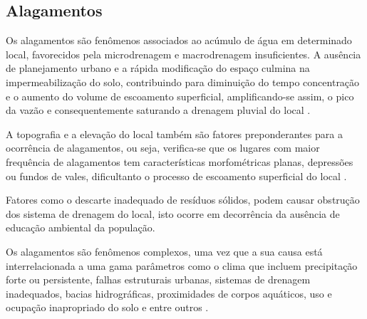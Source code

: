 \subsection{Alagamentos}
Os alagamentos são fenômenos associados ao acúmulo de água em determinado local, favorecidos pela microdrenagem e macrodrenagem insuficientes. A ausência de planejamento urbano e a rápida modificação do espaço culmina na impermeabilização do solo, contribuindo para diminuição do tempo concentração e o aumento do volume de escoamento superficial, amplificando-se assim, o pico da vazão e consequentemente saturando a drenagem pluvial do local \cite{hansmann2013descriccao}. 
\par A topografia e a elevação do local também são fatores preponderantes para a ocorrência de alagamentos, ou seja, verifica-se que os lugares com maior frequência de alagamentos tem características morfométricas planas, depressões ou fundos de vales, dificultanto o processo de escoamento superficial do local \cite{braga2016alagamentos}.
\par Fatores como o descarte inadequado de resíduos sólidos, podem causar obstrução dos sistema de drenagem do local, isto ocorre em decorrência da ausência de educação ambiental da população. 
\par Os alagamentos são fenômenos complexos, uma vez que a sua causa está  interrelacionada a uma gama parâmetros como o clima que incluem precipitação forte ou persistente, falhas estruturais urbanas, sistemas de drenagem inadequados, bacias hidrográficas, proximidades de corpos aquáticos, uso e ocupação inapropriado do solo e entre outros \cite{doocy2013human}. 


